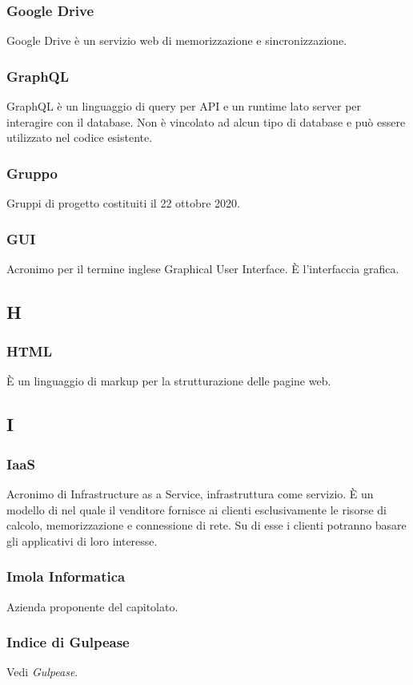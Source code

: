 \subsubsection*{Google Drive} Google Drive è un servizio web di memorizzazione e sincronizzazione.
\subsubsection*{GraphQL} GraphQL è un linguaggio di query per API e un runtime lato server per interagire con il database. Non è vincolato ad alcun tipo di database e può essere utilizzato nel codice esistente.
\subsubsection*{Gruppo} Gruppi di progetto costituiti il 22 ottobre 2020.
\subsubsection*{GUI} Acronimo per il termine inglese Graphical User Interface. È l'interfaccia grafica.
\subsection*{H}
\subsubsection*{HTML} È un linguaggio di markup per la strutturazione delle pagine web.
\subsection*{I}
\subsubsection*{IaaS} Acronimo di Infrastructure as a Service, infrastruttura come servizio. È un modello di  nel quale il venditore fornisce ai clienti esclusivamente le risorse di calcolo, memorizzazione e connessione di rete. Su di esse i clienti potranno basare gli applicativi di loro interesse.
\subsubsection*{Imola Informatica} Azienda proponente del capitolato.
\subsubsection*{Indice di Gulpease} Vedi \textit{Gulpease}.
